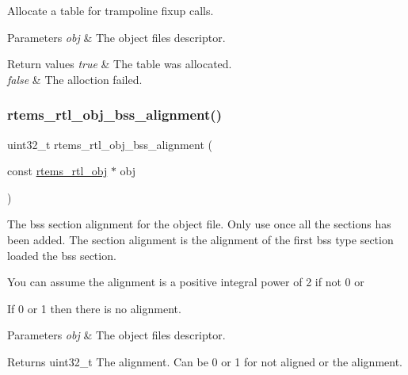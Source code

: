 Allocate a table for trampoline fixup calls.


\begin{DoxyParams}{Parameters}
{\em obj} & The object file\textquotesingle{}s descriptor. \\
\hline
\end{DoxyParams}

\begin{DoxyRetVals}{Return values}
{\em true} & The table was allocated. \\
\hline
{\em false} & The alloction failed. \\
\hline
\end{DoxyRetVals}
\mbox{\label{rtl-obj_8c_a02b040b6c3f07084733c2cb226e98fb8}} 
\subsubsection{\texorpdfstring{rtems\_rtl\_obj\_bss\_alignment()}{rtems\_rtl\_obj\_bss\_alignment()}}
{\footnotesize\ttfamily uint32\+\_\+t rtems\+\_\+rtl\+\_\+obj\+\_\+bss\+\_\+alignment (\begin{DoxyParamCaption}\item[{const \mbox{\hyperlink{structrtems__rtl__obj}{rtems\+\_\+rtl\+\_\+obj}} $\ast$}]{obj }\end{DoxyParamCaption})}

The bss section alignment for the object file. Only use once all the sections has been added. The section alignment is the alignment of the first bss type section loaded the bss section.

You can assume the alignment is a positive integral power of 2 if not 0 or
\begin{DoxyEnumerate}
\item If 0 or 1 then there is no alignment.
\end{DoxyEnumerate}


\begin{DoxyParams}{Parameters}
{\em obj} & The object file\textquotesingle{}s descriptor. \\
\hline
\end{DoxyParams}
\begin{DoxyReturn}{Returns}
uint32\+\_\+t The alignment. Can be 0 or 1 for not aligned or the alignment. 
\end{DoxyReturn}
\mbox{\label{rtl-obj_8c_a6125a7787e7b842bc39aa69370b7db2b}} 
